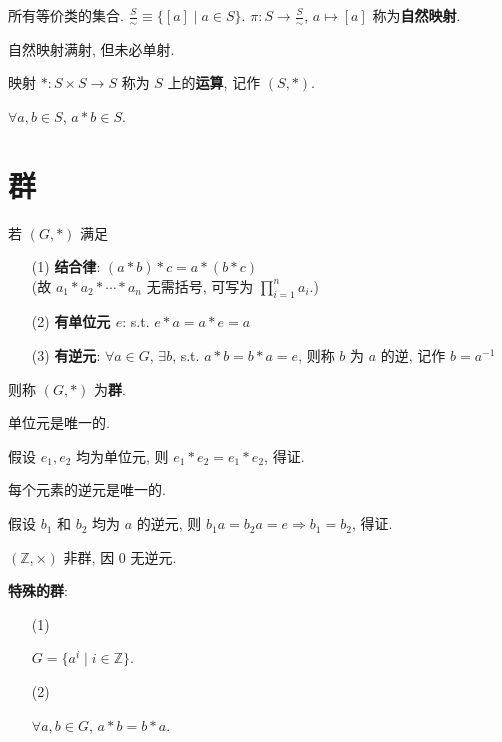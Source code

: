 \documentclass{note}
\begin{document}
\begin{df}[商类]
    所有等价类的集合. $\frac{S}{\sim}\equiv\{[a]\mid a\in S\}$. $\pi: S\rightarrow\frac{S}{\sim}$, $a\mapsto[a]$ 称为\textbf{自然映射}.
\end{df}

自然映射满射, 但未必单射.

\begin{df}[运算]
    映射 $*:S\times S\rightarrow S$ 称为 $S$ 上的\textbf{运算}, 记作 $(S,*)$.
\end{df}

$\forall a,b\in S$, $a*b\in S$.

\section{群}
\begin{df}[群]
    若 $(G,*)$ 满足
    \begin{itemize}
        \item[(1)] \textbf{结合律}: $(a*b)*c=a*(b*c)$\\
        (故 $a_1*a_2*\cdots*a_n$ 无需括号, 可写为 $\prod_{i=1}^na_i$.)
        \item[(2)] \textbf{有单位元 $e$}: s.t. $e*a=a*e=a$
        \item[(3)] \textbf{有逆元}: $\forall a\in G$, $\exists b$, s.t. $a*b=b*a=e$, 则称 $b$ 为 $a$ 的逆, 记作 $b=a^{-1}$
    \end{itemize}
    则称 $(G,*)$ 为\textbf{群}.
\end{df}

\begin{thm}
    单位元是唯一的.
\end{thm}
\begin{pf}
    假设 $e_1,e_2$ 均为单位元, 则 $e_1*e_2=e_1*e_2$, 得证.
\end{pf}

\begin{thm}
    每个元素的逆元是唯一的.
\end{thm}
\begin{pf}
    假设 $b_1$ 和 $b_2$ 均为 $a$ 的逆元, 则 $b_1a=b_2a=e\Longrightarrow b_1=b_2$, 得证.
\end{pf}

\begin{eg}
    $(\mathbb{Z},\times)$ 非群, 因 $0$ 无逆元.
\end{eg}

\textbf{特殊的群}:
\begin{itemize}
    \item[(1)] \begin{eg}[循环群]
        $G=\{a^i\mid i\in\mathbb{Z}\}$.
    \end{eg}
    \item[(2)] \begin{eg}
        $\forall a,b\in G$, $a*b=b*a$.
    \end{eg}
\end{itemize}
\end{document}
